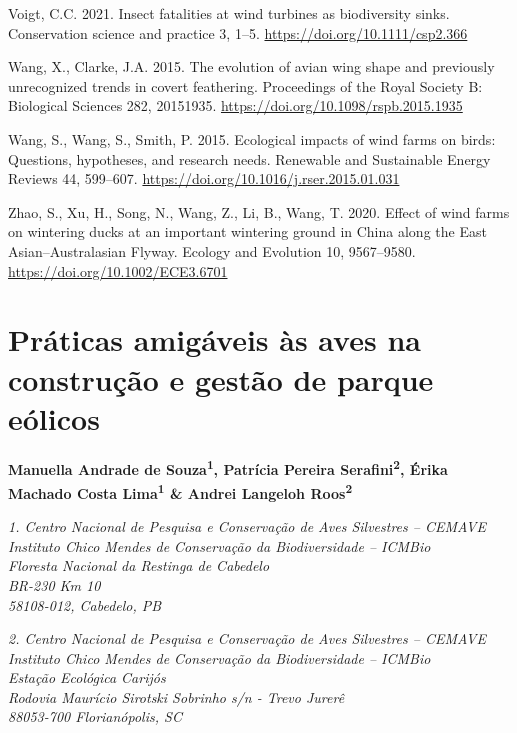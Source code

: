\documentclass[
  oneside]{scrbook}
\begin{document}
Voigt, C.C. 2021. Insect fatalities at wind turbines as biodiversity sinks. Conservation science and practice 3, 1--5. \url{https://doi.org/10.1111/csp2.366}

Wang, X., Clarke, J.A. 2015. The evolution of avian wing shape and previously unrecognized trends in covert feathering. Proceedings of the Royal Society B: Biological Sciences 282, 20151935. \url{https://doi.org/10.1098/rspb.2015.1935}

Wang, S., Wang, S., Smith, P. 2015. Ecological impacts of wind farms on birds: Questions, hypotheses, and research needs. Renewable and Sustainable Energy Reviews 44, 599--607. \url{https://doi.org/10.1016/j.rser.2015.01.031}

Zhao, S., Xu, H., Song, N., Wang, Z., Li, B., Wang, T. 2020. Effect of wind farms on wintering ducks at an important wintering ground in China along the East Asian--Australasian Flyway. Ecology and Evolution 10, 9567--9580. \url{https://doi.org/10.1002/ECE3.6701}

\hypertarget{cap5}{%
\chapter{Práticas amigáveis às aves na construção e gestão de parque eólicos}\label{cap5}}

\pagestyle{headings}

\textbf{Manuella Andrade de Souza\textsuperscript{1}, Patrícia Pereira Serafini\textsuperscript{2}, Érika Machado Costa Lima\textsuperscript{1} \& Andrei Langeloh Roos\textsuperscript{2}}

\emph{1. Centro Nacional de Pesquisa e Conservação de Aves Silvestres -- CEMAVE}\\
\emph{Instituto Chico Mendes de Conservação da Biodiversidade -- ICMBio}\\
\emph{Floresta Nacional da Restinga de Cabedelo}\\
\emph{BR-230 Km 10}\\
\emph{58108-012, Cabedelo, PB}

\emph{2. Centro Nacional de Pesquisa e Conservação de Aves Silvestres -- CEMAVE}\\
\emph{Instituto Chico Mendes de Conservação da Biodiversidade -- ICMBio}\\
\emph{Estação Ecológica Carijós}\\
\emph{Rodovia Maurício Sirotski Sobrinho s/n - Trevo Jurerê}\\
\emph{88053-700 Florianópolis, SC}
\end{document}
